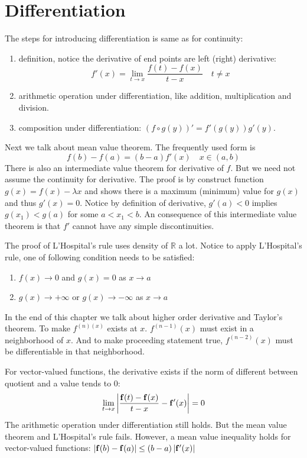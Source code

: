 \chapter{Differentiation}
The steps for introducing differentiation is same as for continuity:
\begin{enumerate}
    \item definition, notice the derivative of end points are left (right) derivative:
    \begin{equation*}
        f'(x)=\lim_{t\to x}\frac{f(t)-f(x)}{t-x}\quad t\neq x
    \end{equation*}
    \item arithmetic operation under differentiation, like addition, multiplication and division.
    \item composition under differentiation: $(f\circ g(y))'=f'(g(y))g'(y)$.
\end{enumerate}
Next we talk about mean value theorem. The frequently used form is 
\begin{equation*}
    f(b)-f(a)=(b-a)f'(x) \quad x\in (a,b)
\end{equation*}
There is also an intermediate value theorem for derivative of $f$. But we need not assume the continuity for derivative. The proof is by construct function $g(x)=f(x)-\lambda x$ and shows there is a maximum (minimum) value for $g(x)$ and thus $g'(x)=0$. Notice by definition of derivative, $g'(a)<0$ implies $g(x_1)<g(a)$ for some $a<x_1<b$. An consequence of this intermediate value theorem is that $f'$ cannot have any simple discontinuities.\par
The proof of L'Hospital's rule uses density of $\mathbb{R}$ a lot. Notice to apply L'Hospital's rule, one of following condition needs to be satisfied:
\begin{enumerate}
    \item $f(x)\to 0$ and $g(x)=0$ as $x\to a$
    \item $g(x)\to +\infty$ or $g(x)\to -\infty$ as $x\to a$
\end{enumerate}
In the end of this chapter we talk about higher order derivative and Taylor's theorem. To make $f^{(n)(x)}$ exists at $x$. $f^{(n-1)}(x)$ must exist in a neighborhood of $x$. And to make proceeding statement true, $f^{(n-2)}(x)$ must be differentiable in that neighborhood.\par
For vector-valued functions, the derivative exists if the norm of different between quotient and a value tends to 0:
\begin{equation*}
    \lim_{t\to x}\left\lvert\frac{\mathbf{f}(t)-\mathbf{f}(x)}{t-x}-\mathbf{f}'(x)\right\rvert=0
\end{equation*}
The arithmetic operation under differentiation still holds. But the mean value theorem and L'Hospital's rule fails. However, a mean value inequality holds for vector-valued functions: $\left\lvert\mathbf{f}(b)-\mathbf{f}(a)\right\rvert\leq (b-a)\left\lvert\mathbf{f}'(x)\right\rvert$

